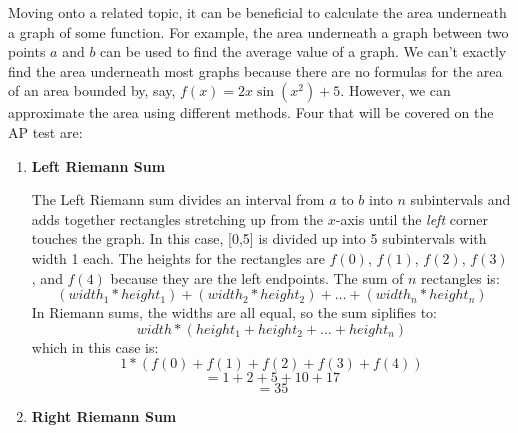 \documentclass[../revisedmain.tex]{subfiles}
\begin{document}
Moving onto a related topic, it can be beneficial to calculate the area underneath a graph of some function. For example, the area underneath a graph between two points $a$ and $b$ can be used to find the average value of a graph. We can't exactly find the area underneath most graphs because there are no formulas for the area of an area bounded by, say, $f(x)=2x\sin(x^2)+5$. However, we can approximate the area using different methods. Four that will be covered on the AP test are:
\begin{enumerate}
	\item \textbf{Left Riemann Sum}
	\begin{center}
	\end{center}
	The Left Riemann sum divides an interval from $a$ to $b$ into $n$ subintervals and adds together rectangles stretching up from the $x$-axis until the \textit{left} corner touches the graph. In this case, [0,5] is divided up into 5 subintervals with width 1 each. The heights for the rectangles are $f(0)$, $f(1)$, $f(2)$, $f(3)$, and $f(4)$ because they are the left endpoints. The sum of $n$ rectangles is:$$(width_1*height_1) + (width_2*height_2) + \dots +(width_n*height_n)$$ In Riemann sums, the widths are all equal, so the sum siplifies to:$$width*(height_1+height_2+\dots+height_n)$$ which in this case is:$$1*\left(f(0)+f(1)+f(2)+f(3)+f(4)\right)$$$$=1+2+5+10+17$$$$=35$$
	\item \textbf{Right Riemann Sum}
		\begin{center}
\end{center}
\end{enumerate}
\end{document}
